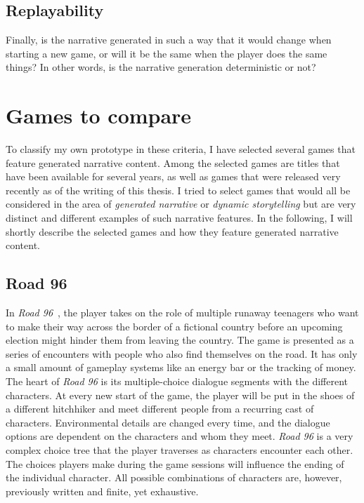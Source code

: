 \subsection{Replayability}
Finally, is the narrative generated in such a way that it would change when starting a new game, or will it be the same when the player does the same things? In other words, is the narrative generation deterministic or not?
\section{Games to compare}
To classify my own prototype in these criteria, I have selected several games that feature generated narrative content. Among the selected games are titles that have been available for several years, as well as games that were released very recently as of the writing of this thesis. I tried to select games that would all be considered in the area of \textit{generated narrative} or \textit{dynamic storytelling} but are very distinct and different examples of such narrative features. In the following, I will shortly describe the selected games and how they feature generated narrative content.
\subsection{Road 96}
In \textit{Road 96}~\cite{road}, the player takes on the role of multiple runaway teenagers who want to make their way across the border of a fictional country before an upcoming election might hinder them from leaving the country. The game is presented as a series of encounters with people who also find themselves on the road. It has only a small amount of gameplay systems like an energy bar or the tracking of money.\\
The heart of \textit{Road 96} is its multiple-choice dialogue segments with the different characters. At every new start of the game, the player will be put in the shoes of a different hitchhiker and meet different people from a recurring cast of characters. Environmental details are changed every time, and the dialogue options are dependent on the characters and whom they meet. \textit{Road 96} is a very complex choice tree that the player traverses as characters encounter each other. The choices players make during the game sessions will influence the ending of the individual character. All possible combinations of characters are, however, previously written and finite, yet exhaustive.
